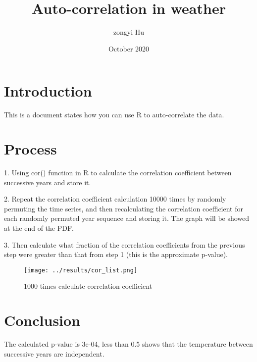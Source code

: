\documentclass{article}
\title{Auto-correlation in weather}
\author{zongyi Hu}
\date{October 2020}
\begin{document}
\maketitle

\section{Introduction}
This is a document states how you can use R to auto-correlate the data.

\section{Process}

1. Using cor() function in R to calculate the correlation coefficient between successive years and store it. 

2. Repeat the correlation coefficient calculation 10000 times by randomly permuting the time series, and then recalculating the correlation coefficient for each randomly permuted year sequence and storing it. The graph will be showed at the end of the PDF.

3. Then calculate what fraction of the correlation coefficients from the previous step were greater than that from step 1 (this is the approximate p-value).

\begin{figure}[h!]

\centering
\texttt{[image: ../results/cor\_list.png]}
\caption{1000 times calculate correlation coefficient}
\label{fig:universe}

\end{figure}



\section{Conclusion}
The calculated p-value is 3e-04, less than 0.5 shows that the temperature between successive years are independent.
\end{document}

